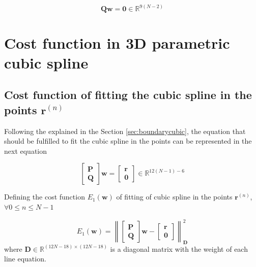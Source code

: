 \begin{equation}
\mathbf{Q}
\mathbf{w}
=\mathbf{0}\in \mathbb{R}^{9(N-2)}
\end{equation}

\section{Cost function in 3D parametric cubic spline}

\subsection{Cost function of fitting the cubic spline in the points $\mathbf{r}^{(n)}$}

Following the explained in the Section \ref{sec:boundarycubic},
the equation that should be fulfilled to fit the cubic spline in the points can be represented in the next equation

\begin{equation}
\begin{bmatrix}
\mathbf{P}\\
\mathbf{Q}
\end{bmatrix}
\mathbf{w}
=
\begin{bmatrix}
\mathbf{r}\\
\mathbf{0}
\end{bmatrix}
\in \mathbb{R}^{12(N-1)-6}
\end{equation}

Defining the cost function $E_{1}(\mathbf{w})$ of fitting of cubic spline in the points $\mathbf{r}^{(n)}$,
$\forall 0\leq n\leq N-1$

\begin{equation}\label{eq:costfunc1}
E_{1}(\mathbf{w})
=
\left\|
\begin{bmatrix}
\mathbf{P}\\
\mathbf{Q}
\end{bmatrix}
\mathbf{w}
-
\begin{bmatrix}
\mathbf{r}\\
\mathbf{0}
\end{bmatrix}
\right\|_{\mathbf{D}}^{2}
\end{equation}
where $\mathbf{D}\in \mathbb{R}^{(12N-18)\times(12N-18)}$ is a diagonal matrix with the weight of each line equation.

